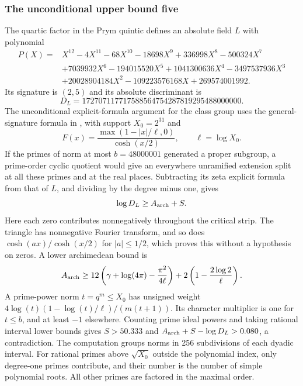 \subsubsection{The unconditional upper bound five}

The quartic factor in the Prym quintic defines an absolute field $L$
with polynomial
\[
\begin{split}
 P(X)={}&X^{12}-4X^{11}-68X^{10}-18698X^9+336998X^8-500324X^7\\
       &+7039932X^6-194015520X^5+1041300636X^4-3497537936X^3\\
       &+20028904184X^2-109223576168X+269574001992.
\end{split}
\]
Its signature is $(2,5)$ and its absolute discriminant is
\[ D_L=172707117717588564754287819295488000000. \]
The unconditional explicit-formula argument for the class group uses
the general-signature formula in \cite[Section~4]{miller}, with
support $X_0=2^{31}$ and
\[
 F(x)=\frac{\max(1-|x|/\ell,0)}{\cosh(x/2)},\qquad\ell=\log X_0.
\]
If the primes of norm at most $b=48000001$ generated a proper
subgroup, a prime-order cyclic quotient would give an everywhere
unramified extension split at all these primes and at the real
places. Subtracting its zeta explicit formula from that of $L$, and
dividing by the degree minus one, gives
\[
 \log D_L\geq A_{\rm arch}+S.
\]
Here each zero contributes nonnegatively throughout the critical
strip. The triangle has nonnegative Fourier transform, and so does
$\cosh(ax)/\cosh(x/2)$ for $|a|\leq1/2$, which proves this without
a hypothesis on zeros. A lower archimedean bound is
\[
 A_{\rm arch}\geq12\left(\gamma+\log(4\pi)
                  -\frac{\pi^2}{4\ell}\right)
                     +2\left(1-\frac{2\log2}{\ell}\right).
\]
A prime-power norm $t=q^m\leq X_0$ has unsigned weight
$4\log(t)(1-\log(t)/\ell)/(m(t+1))$. Its character multiplier
is one for $t\leq b$, and at least $-1$ elsewhere. Counting prime
ideal powers and taking rational interval lower bounds gives
$S>50.333$ and $A_{\rm arch}+S-\log D_L>0.080$, a contradiction.
The computation groups norms in 256 subdivisions of each dyadic
interval. For rational primes above $\sqrt{X_0}$ outside the
polynomial index, only degree-one primes contribute, and their number
is the number of simple polynomial roots. All other primes are
factored in the maximal order.

